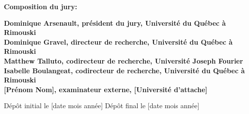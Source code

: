 \thispagestyle{empty}

\null
\vfill
\noindent \textbf{Composition du jury:}\\
\vspace{1cm}

\begin{singlespace}
  \noindent \textbf{Dominique Arsenault, président du jury, Université du Québec à Rimouski}\\

  \noindent \textbf{Dominique Gravel, directeur de recherche, Université du Québec à Rimouski}\\

  \noindent \textbf{Matthew Talluto, codirecteur de recherche, Université Joseph Fourier}\\

  \noindent \textbf{Isabelle Boulangeat, codirecteur de recherche, Université du Québec à Rimouski}\\

  \noindent \textbf{[Prénom Nom], examinateur externe, [Université d’attache]}\\
\end{singlespace}

\vspace{2cm}
\noindent Dépôt initial le [date mois année]
\hspace{3cm}
Dépôt final le [date mois année]


\cleardoublepage
